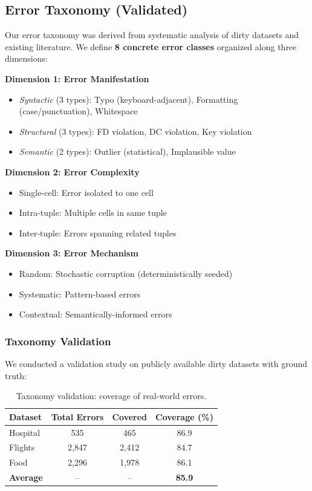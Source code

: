 \documentclass[11pt,a4paper]{article}
\begin{document}
\subsection{Error Taxonomy (Validated)}
\label{sec:taxonomy}

Our error taxonomy was derived from systematic analysis of dirty datasets and existing literature. We define \textbf{8 concrete error classes} organized along three dimensions:

\textbf{Dimension 1: Error Manifestation}
\begin{itemize}
    \item \textit{Syntactic} (3 types): Typo (keyboard-adjacent), Formatting (case/punctuation), Whitespace
    \item \textit{Structural} (3 types): FD violation, DC violation, Key violation
    \item \textit{Semantic} (2 types): Outlier (statistical), Implausible value
\end{itemize}

\textbf{Dimension 2: Error Complexity}
\begin{itemize}
    \item Single-cell: Error isolated to one cell
    \item Intra-tuple: Multiple cells in same tuple
    \item Inter-tuple: Errors spanning related tuples
\end{itemize}

\textbf{Dimension 3: Error Mechanism}
\begin{itemize}
    \item Random: Stochastic corruption (deterministically seeded)
    \item Systematic: Pattern-based errors
    \item Contextual: Semantically-informed errors
\end{itemize}

\subsubsection{Taxonomy Validation}

We conducted a validation study on publicly available dirty datasets with ground truth:

\begin{table}[t]
\caption{Taxonomy validation: coverage of real-world errors.}
\label{tab:validation}
\centering
\begin{tabular}{lccc}
\toprule
Dataset & Total Errors & Covered & Coverage (\%) \\
\midrule
Hospital & 535 & 465 & 86.9 \\
Flights & 2,847 & 2,412 & 84.7 \\
Food & 2,296 & 1,978 & 86.1 \\
\midrule
\textbf{Average} & -- & -- & \textbf{85.9} \\
\bottomrule
\end{tabular}
\end{table}
\end{document}
